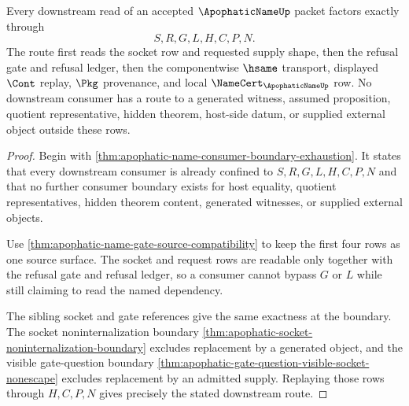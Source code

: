 \begin{theorem}
\label{thm:apophatic-name-downstream-socket-route-exactness}
Every downstream read of an accepted $\ApophaticNameUp$ packet factors exactly through
$$
S,R,G,L,H,C,P,N.
$$
The route first reads the socket row and requested supply shape, then the refusal gate and refusal ledger, then the componentwise $\hsame$ transport, displayed $\Cont$ replay, $\Pkg$ provenance, and local $\NameCert_{\ApophaticNameUp}$ row. No downstream consumer has a route to a generated witness, assumed proposition, quotient representative, hidden theorem, host-side datum, or supplied external object outside these rows.
\end{theorem}
\begin{proof}
Begin with \autoref{thm:apophatic-name-consumer-boundary-exhaustion}. It states that every downstream consumer is already confined to $S,R,G,L,H,C,P,N$ and that no further consumer boundary exists for host equality, quotient representatives, hidden theorem content, generated witnesses, or supplied external objects.

Use \autoref{thm:apophatic-name-gate-source-compatibility} to keep the first four rows as one source surface. The socket and request rows are readable only together with the refusal gate and refusal ledger, so a consumer cannot bypass $G$ or $L$ while still claiming to read the named dependency.

The sibling socket and gate references give the same exactness at the boundary. The socket noninternalization boundary \autoref{thm:apophatic-socket-noninternalization-boundary} excludes replacement by a generated object, and the visible gate-question boundary \autoref{thm:apophatic-gate-question-visible-socket-nonescape} excludes replacement by an admitted supply. Replaying those rows through $H,C,P,N$ gives precisely the stated downstream route.
\end{proof}

